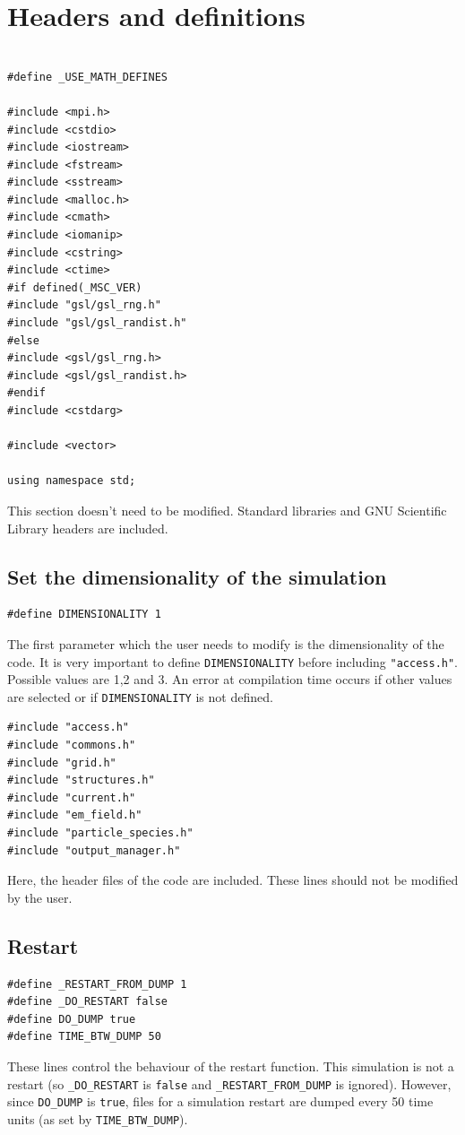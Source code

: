 \documentclass[11pt,a4paper]{report}
\begin{document}
\section{Headers and definitions}
\begin{lstlisting}[backgroundcolor=\color{no_modify}]

#define _USE_MATH_DEFINES

#include <mpi.h>
#include <cstdio>
#include <iostream>
#include <fstream>
#include <sstream>
#include <malloc.h>
#include <cmath>
#include <iomanip>
#include <cstring>
#include <ctime>    
#if defined(_MSC_VER)
#include "gsl/gsl_rng.h" 
#include "gsl/gsl_randist.h"
#else
#include <gsl/gsl_rng.h> 
#include <gsl/gsl_randist.h>
#endif
#include <cstdarg> 

#include <vector>

using namespace std;
\end{lstlisting}
This section doesn't need to be modified. Standard libraries and GNU Scientific Library headers are included.\\

\subsection*{Set the dimensionality of the simulation}
\begin{lstlisting}
#define DIMENSIONALITY 1
\end{lstlisting}
The first parameter which the user needs to modify is the dimensionality of the code. It is very important to define \verb+DIMENSIONALITY+ before including \verb+"access.h"+. Possible values are 1,2 and 3. An error at compilation time occurs if other values are selected or if \verb+DIMENSIONALITY+ is not defined.
\begin{lstlisting}[backgroundcolor=\color{no_modify}]
#include "access.h"
#include "commons.h"
#include "grid.h"
#include "structures.h"
#include "current.h"
#include "em_field.h"
#include "particle_species.h"
#include "output_manager.h"
\end{lstlisting}
Here, the header files of the code are included. These lines should not be modified by the user.\\

\subsection*{Restart}
\begin{lstlisting}
#define _RESTART_FROM_DUMP 1
#define _DO_RESTART false
#define DO_DUMP true
#define TIME_BTW_DUMP 50
\end{lstlisting}
These lines control the behaviour of the restart function.
This simulation is not a restart (so \verb+_DO_RESTART+ is \verb+false+ and \verb+_RESTART_FROM_DUMP+ is
ignored). However, since \verb+DO_DUMP+ is \verb+true+, files for a simulation restart are dumped every 50 time units (as set by \verb+TIME_BTW_DUMP+).
\end{document}

